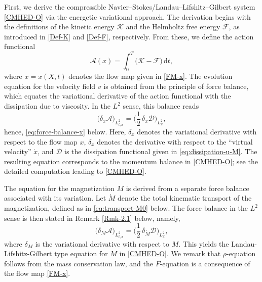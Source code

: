 \documentclass[reqno,11pt]{amsart}
\numberwithin{equation}{section}
\def\d{\mathrm{d}}
\begin{document}
First, we derive the compressible Navier–Stokes/Landau–Lifshitz–Gilbert system \eqref{CMHED-O} via the energetic variational approach. The derivation begins with the definitions of the kinetic energy $\mathcal{K}$ and the Helmholtz free energy $\mathcal{F}$, as introduced in \eqref{Def-K} and \eqref{Def-F}, respectively. From these, we define the action functional
\[
\mathcal{A}( {x} ) = \int_0^T \big( \mathcal{K} - \mathcal{F} \big) \, \d t,
\]
where $ {x} = {x}(X, t)$ denotes the flow map given in \eqref{FM-x}. The evolution equation for the velocity field ${v}$ is obtained from the principle of force balance, which equates the variational derivative of the action functional with the dissipation due to viscosity. In the $L^2$ sense, this balance reads
\begin{equation*}
\big( \delta_{x} \mathcal{A} \big)_{L^2_{t,x}} = \Big( \frac{1}{2} \, \delta_{\dot{x}} \mathcal{D} \Big)_{L^2_x},
\end{equation*}
hence, \eqref{eq:force-balance-x} below. Here, $\delta_{x}$ denotes the variational derivative with respect to the flow map $x$, $\delta_{\dot{x}}$ denotes the derivative with respect to the ``virtual velocity'' $\dot{x}$, and $\mathcal{D}$ is the dissipation functional given in \eqref{eq:dissipation-u-M}. The resulting equation corresponds to the momentum balance in \eqref{CMHED-O}; see the detailed computation leading to \eqref{CMHED-O}.

The equation for the magnetization $ {M}$ is derived from a separate force balance associated with its variation. Let $\mathring{M}$ denote the total kinematic transport of the magnetization, defined as in \eqref{eq:transport-M0} below. The force balance in the $L^2$ sense is then stated in Remark \ref{Rmk-2.1} below, namely,
\begin{equation*} 
\big( \delta_{ {M}} \mathcal{A} \big)_{L^2_{t,x}} = \Big( \frac{1}{2} \, \delta_{\mathring{M}} \mathcal{D} \Big)_{L^2_x},
\end{equation*}
where $\delta_{ {M}}$ is the variational derivative with respect to $ {M}$. This yields the Landau-Lifshitz-Gilbert type equation for $ {M}$ in \eqref{CMHED-O}. We remark that $\rho$-equation follows from the mass conservation law, and the $F$-equation is a consequence of the flow map \eqref{FM-x}.
\end{document}

